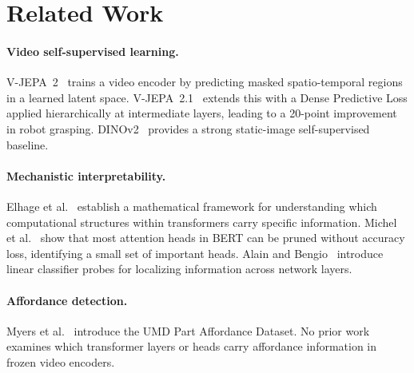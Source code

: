 \section{Related Work}
\label{sec:related}

\paragraph{Video self-supervised learning.}
V-JEPA~2~\cite{bardes2025vjepa2} trains a video encoder by predicting masked spatio-temporal
regions in a learned latent space.
V-JEPA~2.1~\cite{bardes2026vjepa21} extends this with a Dense Predictive Loss applied
hierarchically at intermediate layers, leading to a 20-point improvement in robot grasping.
DINOv2~\cite{oquab2024dinov2} provides a strong static-image self-supervised baseline.

\paragraph{Mechanistic interpretability.}
Elhage et al.~\cite{elhage2021circuits} establish a mathematical framework for understanding
which computational structures within transformers carry specific information.
Michel et al.~\cite{michel2019sixteen} show that most attention heads in BERT can be pruned
without accuracy loss, identifying a small set of important heads.
Alain and Bengio~\cite{alain2016probes} introduce linear classifier probes for localizing
information across network layers.

\paragraph{Affordance detection.}
Myers et al.~\cite{myers2015affordance} introduce the UMD Part Affordance Dataset.
No prior work examines which transformer layers or heads carry affordance information
in frozen video encoders.
